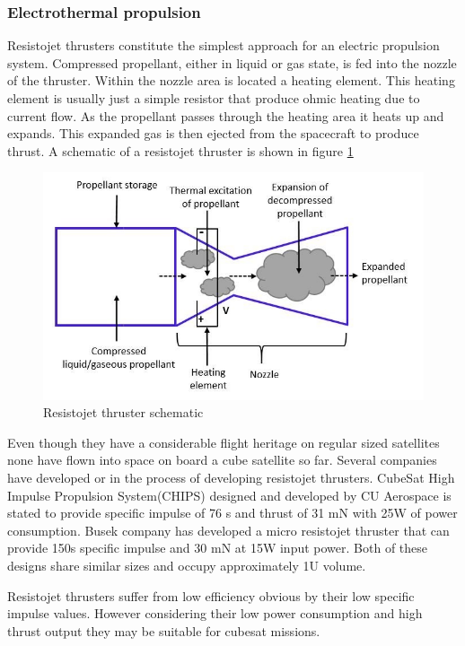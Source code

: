 \subsubsection{Electrothermal propulsion}

Resistojet thrusters constitute the simplest approach for an electric propulsion system. Compressed propellant, either in liquid or gas state, is fed into the nozzle of the thruster. Within the nozzle area is located a heating element. This heating element is usually just a simple resistor that produce ohmic heating due to current flow. As the propellant passes through the heating area it heats up and expands. This expanded gas is then ejected from the spacecraft to produce thrust. A schematic of a resistojet thruster is shown in figure \ref{fig:resistojet}

\begin{figure}[ht]
    \centering
    \includegraphics[scale=0.65]{fig/resistojet.png}
    \caption[Resistojet thruster schematic]{Resistojet thruster schematic\cite{tummala2017overview}}
    \label{fig:resistojet}
\end{figure}

Even though they have a considerable flight heritage on regular sized satellites none have flown into space on board a cube satellite so far\cite{lemmer2017propulsion}. Several companies have developed or in the process of developing resistojet thrusters. CubeSat High Impulse Propulsion System(CHIPS) designed and developed by CU Aerospace is stated to provide specific impulse of 76 s and thrust of 31 mN with 25W of power consumption\cite{hejmanowski2015cubesat}. Busek company has developed a micro resistojet thruster that can provide 150s specific impulse and 30 mN at 15W input power\cite{lemmer2017propulsion}. Both of these designs share similar sizes and occupy approximately 1U volume. 
\par Resistojet thrusters suffer from low efficiency obvious by their low specific impulse values. However considering their low power consumption and high thrust output they may be suitable for cubesat missions.

